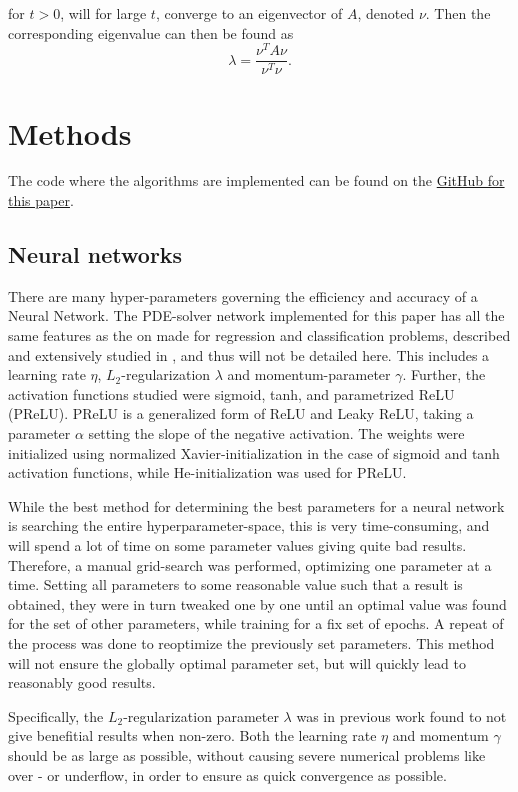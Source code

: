 \documentclass[multicolumn, 10pt]{extarticle}
\begin{document}
for $t>0$, will for large $t$, converge to an eigenvector of $A$, denoted $\nu$. Then the corresponding eigenvalue can then be found as
\begin{equation}\label{eq:eigval}
	\lambda = \frac{\nu^TA\nu}{\nu^T\nu}.
\end{equation}


\section{Methods}
The code where the algorithms are implemented can be found on the \href{https://github.com/SaraPJensen/FYS-STK/tree/main/Project3/code}{GitHub for this paper}.

\subsection{Neural networks}
There are many hyper-parameters governing the efficiency and accuracy of a Neural Network. The PDE-solver network implemented for this paper has all the same features as the on made for regression and classification problems, described and extensively studied in \cite{p2HO}, and thus will not be detailed here. This includes a learning rate $\eta$, $L_2$-regularization $\lambda$ and momentum-parameter $\gamma$. Further, the activation functions studied were sigmoid, tanh, and parametrized ReLU (PReLU). PReLU is a generalized form of ReLU and Leaky ReLU, taking a parameter $\alpha$ setting the slope of the negative activation. The weights were initialized using normalized Xavier-initialization in the case of sigmoid and tanh activation functions, while He-initialization was used for PReLU.


While the best method for determining the best parameters for a neural network is searching the entire hyperparameter-space, this is very time-consuming, and will spend a lot of time on some parameter values giving quite bad results. Therefore, a manual grid-search was performed, optimizing one parameter at a time. Setting all parameters to some reasonable value such that a result is obtained, they were in turn tweaked one by one until an optimal value was found for the set of other parameters, while training for a fix set of epochs. A repeat of the process was done to reoptimize the previously set parameters. This method will not ensure the globally optimal parameter set, but will quickly lead to reasonably good results.

Specifically, the $L_2$-regularization parameter $\lambda$ was in previous work found to not give benefitial results when non-zero. Both the learning rate $\eta$ and momentum $\gamma$ should be as large as possible, without causing severe numerical problems like over - or underflow, in order to ensure as quick convergence as possible.
\end{document}
